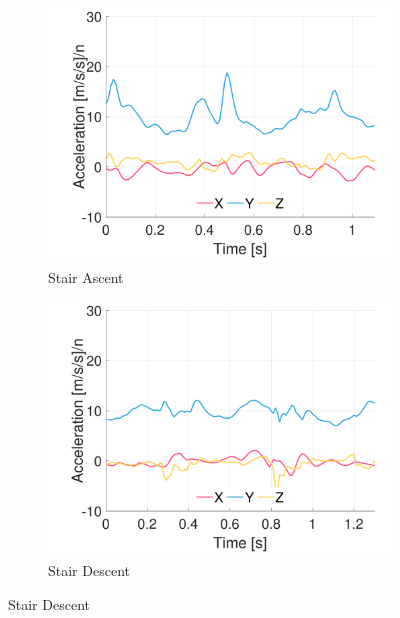 \begin{figure}[p]
    \begin{subfigure}[b]{0.49\textwidth}
         \centering
         \includegraphics[width=\textwidth]{content/3-Methods/example-data/ch3_example_data_subject_01_chest_accel_activity_stair_down.pdf}
         \caption{Stair Ascent}
    \end{subfigure}
    \begin{subfigure}[b]{0.49\textwidth}
         \centering
         \includegraphics[width=\textwidth]{content/3-Methods/example-data/ch3_example_data_subject_01_chest_accel_activity_stair_up.pdf}
         \caption{Stair Descent}
    \end{subfigure}
    

\end{figure}
